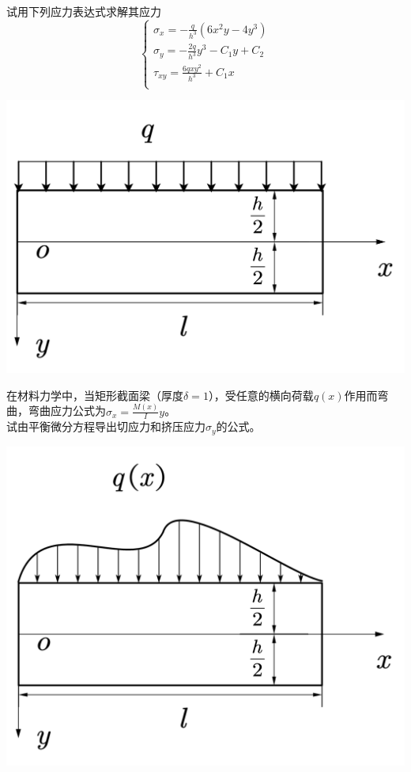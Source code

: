 \begin{example}
	试用下列应力表达式求解其应力\[\begin{cases}
	\sigma _x=-\frac{q}{h^3}\left( 6x^2y-4y^3 \right)\\
	\sigma _y=-\frac{2q}{h^3}y^3-C_1y+C_2\\
	\tau _{xy}=\frac{6qxy^2}{h^3}+C_1x\\
	\end{cases}\]
\end{example}
\centerline{\includegraphics[scale=0.5]{figure/2-13.png}}

\begin{example}
	在材料力学中，当矩形截面梁（厚度$\delta =1$），受任意的横向荷载$q\left( x \right) $作用而弯曲，弯曲应力公式为$\sigma _x=\frac{M\left( x \right)}{I}y$。\\
	试由平衡微分方程导出切应力和挤压应力$\sigma _y$的公式。
\end{example}
\centerline{\includegraphics[scale=0.5]{figure/2-14.png}}